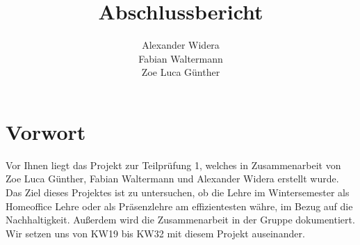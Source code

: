 \documentclass[a4paper,12pt]{scrartcl}
\title {\textbf{Abschlussbericht}}
\author{Alexander Widera \\ Fabian Waltermann \\ Zoe Luca Günther}
\begin{document}
\maketitle
\newpage
\tableofcontents
\newpage
{}

\section{Vorwort}
Vor Ihnen liegt das Projekt zur Teilprüfung 1, welches in Zusammenarbeit von Zoe
Luca Günther, Fabian Waltermann und Alexander Widera erstellt wurde. Das Ziel dieses
Projektes ist zu untersuchen, ob die Lehre im Wintersemester als Homeoffice Lehre oder als Präsenzlehre am effizientesten währe, im Bezug auf die Nachhaltigkeit. Außerdem wird die Zusammenarbeit in der Gruppe dokumentiert.
Wir setzen uns von KW19 bis KW32 mit diesem Projekt auseinander.
\end{document}
